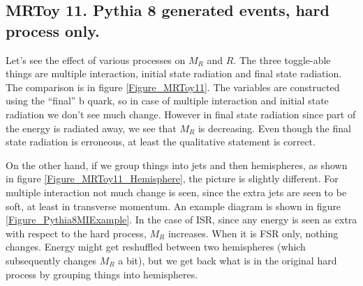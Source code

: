\documentclass{fheadnote}
\begin{document}
\subsection{MRToy 11.  Pythia 8 generated events, hard process only.}

Let's see the effect of various processes on $M_R$ and $R$.  The three toggle-able things are multiple interaction, initial state radiation and final state radiation.
The comparison is in figure \ref{Figure_MRToy11}.  The variables are constructed using the ``final'' b quark, so in case of multiple interaction and initial state radiation we don't see much change.
However in final state radiation since part of the energy is radiated away, we see that $M_R$ is decreasing.
Even though the final state radiation is erroneous, at least the qualitative statement is correct.

On the other hand, if we group things into jets and then hemispheres, as shown in figure \ref{Figure_MRToy11_Hemisphere}, the picture is slightly different.
For multiple interaction not much change is seen, since the extra jets are seen to be soft, at least in transverse momentum.
An example diagram is shown in figure \ref{Figure_Pythia8MIExample}.
In the case of ISR, since any energy is seen as extra with respect to the hard process, $M_R$ increases.
When it is FSR only, nothing changes.  Energy might get reshuffled between two hemispheres (which subsequently changes $M_R$ a bit), but we get back what is in the original hard process by grouping things into hemispheres.
\end{document}
